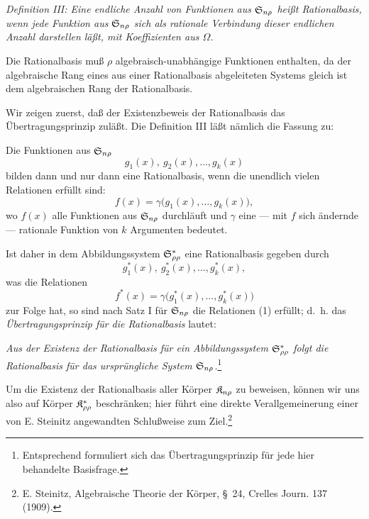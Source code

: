 \emph{Definition III: Eine endliche Anzahl von Funktionen aus $\mathfrak{S}_{n\rho}$ heißt Rationalbasis, wenn jede Funktion aus $\mathfrak{S}_{n\rho}$ sich als rationale Verbindung dieser endlichen Anzahl darstellen läßt, mit Koeffizienten aus $\Omega$.}

Die Rationalbasis muß $\rho$ algebraisch-unabhängige Funktionen enthalten, da der algebraische Rang eines aus einer Rationalbasis abgeleiteten Systems gleich ist dem algebraischen Rang der Rationalbasis.

Wir zeigen zuerst, daß der Existenzbeweis der Rationalbasis das Übertragungsprinzip zuläßt. Die Definition III läßt nämlich die Fassung zu:

Die Funktionen aus $\mathfrak{S}_{n\rho}$
\[
  g_1(x),\ g_2(x),\ldots, g_k(x)
\]
bilden dann und nur dann eine Rationalbasis, wenn die unendlich vielen Relationen erfüllt sind:
\begin{equation}
  f(x)=\gamma\bigl(g_1(x),\ldots,g_k(x)\bigr),
\tag{1}
\end{equation}
wo $f(x)$ alle Funktionen aus $\mathfrak{S}_{n\rho}$ durchläuft und $\gamma$ eine --- mit $f$ sich ändernde --- rationale Funktion von $k$ Argumenten bedeutet.

Ist daher in dem Abbildungssystem $\mathfrak{S}^*_{\rho\rho}$ eine Rationalbasis gegeben durch
\[
  g_1^*(x),\ g_2^*(x),\ldots, g_k^*(x),
\]
was die Relationen
\[
  f^*(x)=\gamma\bigl(g_1^*(x),\ldots,g_k^*(x)\bigr)
\]
zur Folge hat, so sind nach Satz I für $\mathfrak{S}_{n\rho}$ die Relationen (1) erfüllt; d.~h. das \emph{Übertragungsprinzip für die Rationalbasis} lautet:

\emph{Aus der Existenz der Rationalbasis für ein Abbildungssystem $\mathfrak{S}^*_{\rho\rho}$ folgt die Rationalbasis für das ursprüngliche System $\mathfrak{S}_{n\rho}$.}\footnote{Entsprechend formuliert sich das Übertragungsprinzip für jede hier behandelte Basisfrage.}

Um die Existenz der Rationalbasis aller Körper $\mathfrak{K}_{n\rho}$ zu beweisen, können wir uns also auf Körper $\mathfrak{K}^*_{\rho\rho}$ beschränken; hier führt eine direkte Verallgemeinerung einer von E. Steinitz angewandten Schlußweise zum Ziel.\footnote{E. Steinitz, Algebraische Theorie der Körper, \S\ 24, Crelles Journ. 137 (1909).}

